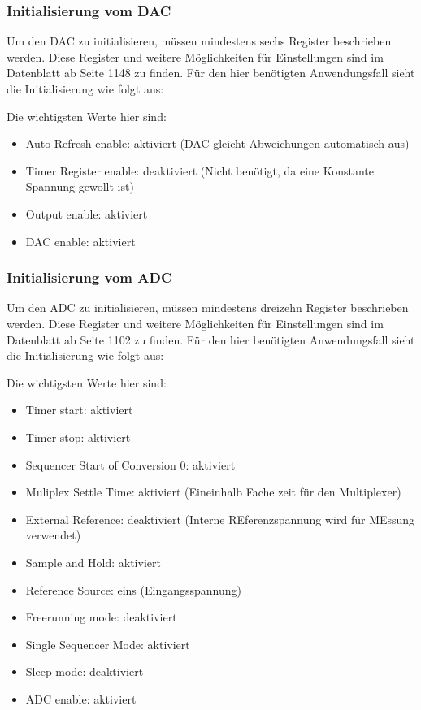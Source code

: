 \documentclass[paper=a4, 12pt]{scrreprt}
\begin{document}
		\subsubsection{Initialisierung vom DAC}\hfill \break
		Um den DAC zu initialisieren, müssen mindestens sechs Register beschrieben werden. Diese Register und weitere Möglichkeiten für Einstellungen sind im Datenblatt ab Seite 1148 zu finden. Für den hier benötigten Anwendungsfall sieht die Initialisierung wie folgt aus: 		 
		
		Die wichtigsten Werte hier sind:
		\begin{itemize}
			\item Auto Refresh enable: aktiviert (DAC gleicht Abweichungen automatisch aus)
			\item Timer Register enable: deaktiviert (Nicht benötigt, da eine Konstante Spannung gewollt ist)
			\item Output enable: aktiviert
			\item DAC enable: aktiviert
		\end{itemize} \newpage
		\subsubsection{Initialisierung vom ADC}\hfill \break
		Um den ADC zu initialisieren, müssen mindestens dreizehn Register beschrieben werden. Diese Register und weitere Möglichkeiten für Einstellungen sind im Datenblatt ab Seite 1102 zu finden. Für den hier benötigten Anwendungsfall sieht die Initialisierung wie folgt aus: 		 
		
		Die wichtigsten Werte hier sind:
		\begin{itemize}
			\item Timer start: aktiviert
			\item Timer stop: aktiviert 
			\item Sequencer Start of Conversion 0: aktiviert
			\item Muliplex Settle Time: aktiviert (Eineinhalb Fache zeit für den Multiplexer)
			\item External Reference: deaktiviert (Interne REferenzspannung wird für MEssung verwendet)
			\item Sample and Hold: aktiviert
			\item Reference Source: eins (Eingangsspannung)
			\item Freerunning mode: deaktiviert
			\item Single Sequencer Mode: aktiviert
			\item Sleep mode: deaktiviert
			\item ADC enable: aktiviert
		\end{itemize} \newpage
		
\end{document}
